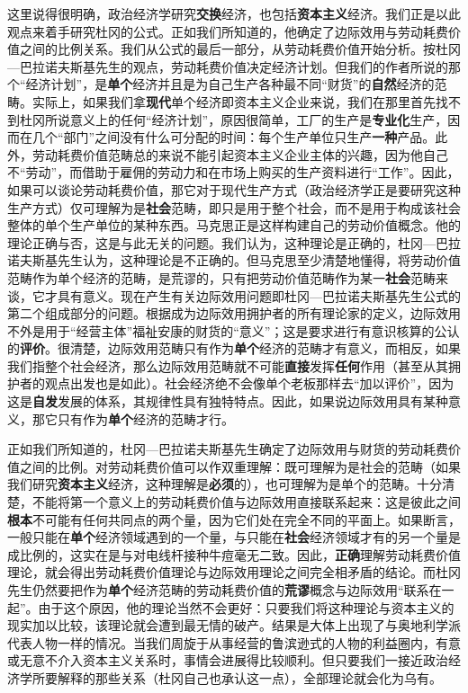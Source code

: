 \documentclass[fontset=fandol, a4paper, 12pt, openright]{ctexbook}
\begin{document}
这里说得很明确，政治经济学研究\textbf{交换}经济，也包括\textbf{资本主义}经济。我们正是以此观点来着手研究杜冈的公式。正如我们所知道的，他确定了边际效用与劳动耗费价值之间的比例关系。我们从公式的最后一部分，从劳动耗费价值开始分析。按杜冈—巴拉诺夫斯基先生的观点，劳动耗费价值决定经济计划。但我们的作者所说的那个“经济计划”，是\textbf{单个}经济并且是为自己生产各种最不同“财货”的\textbf{自然}经济的范畴。实际上，如果我们拿\textbf{现代}单个经济即资本主义企业来说，我们在那里首先找不到杜冈所说意义上的任何“经济计划”，原因很简单，工厂的生产是\textbf{专业化}生产，因而在几个“部门”之间没有什么可分配的时间：每个生产单位只生产\textbf{一种}产品。此外，劳动耗费价值范畴总的来说不能引起资本主义企业主体的兴趣，因为他自己不“劳动”，而借助于雇佣的劳动力和在市场上购买的生产资料进行“工作”。因此，如果可以谈论劳动耗费价值，那它对于现代生产方式（政治经济学正是要研究这种生产方式）仅可理解为是\textbf{社会}范畴，即只是用于整个社会，而不是用于构成该社会整体的单个生产单位的某种东西。马克思正是这样构建自己的劳动价值概念。他的理论正确与否，这是与此无关的问题。我们认为，这种理论是正确的，杜冈—巴拉诺夫斯基先生认为，这种理论是不正确的。但马克思至少清楚地懂得，将劳动价值范畴作为单个经济的范畴，是荒谬的，只有把劳动价值范畴作为某一\textbf{社会}范畴来谈，它才具有意义。现在产生有关边际效用问题即杜冈—巴拉诺夫斯基先生公式的第二个组成部分的问题。根据成为边际效用拥护者的所有理论家的定义，边际效用不外是用于“经营主体”福祉安康的财货的“意义”；这是要求进行有意识核算的公认的\textbf{评价}。很清楚，边际效用范畴只有作为\textbf{单个}经济的范畴才有意义，而相反，如果我们指整个社会经济，那么边际效用范畴就不可能\textbf{直接}发挥\textbf{任何}作用（甚至从其拥护者的观点出发也是如此）。社会经济绝不会像单个老板那样去“加以评价”，因为这是\textbf{自发}发展的体系，其规律性具有独特特点。因此，如果说边际效用具有某种意义，那它只有作为\textbf{单个}经济的范畴才行。

正如我们所知道的，杜冈—巴拉诺夫斯基先生确定了边际效用与财货的劳动耗费价值之间的比例。对劳动耗费价值可以作双重理解：既可理解为是社会的范畴（如果我们研究\textbf{资本主义}经济，这种理解是\textbf{必须}的），也可理解为是单个的范畴。十分清楚，不能将第一个意义上的劳动耗费价值与边际效用直接联系起来：这是彼此之间\textbf{根本}不可能有任何共同点的两个量，因为它们处在完全不同的平面上。如果断言，一般只能在\textbf{单个}经济领域遇到的一个量，与只能在\textbf{社会}经济领域才有的另一个量是成比例的，这实在是与对电线杆接种牛痘毫无二致。因此，\textbf{正确}理解劳动耗费价值理论，就会得出劳动耗费价值理论与边际效用理论之间完全相矛盾的结论。而杜冈先生仍然要把作为\textbf{单个}经济范畴的劳动耗费价值的\textbf{荒谬}概念与边际效用“联系在一起”。由于这个原因，他的理论当然不会更好：只要我们将这种理论与资本主义的现实加以比较，该理论就会遭到最无情的破产。结果是大体上出现了与奥地利学派代表人物一样的情况。当我们周旋于从事经营的鲁滨逊式的人物的利益圈内，有意或无意不介入资本主义关系时，事情会进展得比较顺利。但只要我们一接近政治经济学所要解释的那些关系（杜冈自己也承认这一点），全部理论就会化为乌有。
\end{document}
